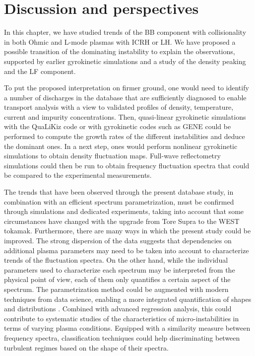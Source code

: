 \section{Discussion and perspectives} \label{discussion_perspective}

In this chapter, we have studied trends of the BB component with collisionality in both Ohmic and L-mode plasmas with ICRH or LH. We have proposed a possible transition of the dominating instability to explain the observations, supported by earlier gyrokinetic simulations and a study of the density peaking and the LF component.

To put the proposed interpretation on firmer ground, one would need to identify a number of discharges in the database that are sufficiently diagnosed to enable transport analysis with a view to validated profiles of density, temperature, current and impurity concentrations. Then, quasi-linear gyrokinetic simulations with the QuaLiKiz code \cite{Bourdelle_2007_PoP_Qualikiz} or with gyrokinetic codes such as GENE could be performed to compute the growth rates of the different instabilities and deduce the dominant ones. In a next step, ones would perform nonlinear gyrokinetic simulations to obtain density fluctuation maps. Full-wave reflectometry simulations could then be run to obtain frequency fluctuation spectra that could be compared to the experimental measurements.

The trends that have been observed through the present database study, in combination with an efficient spectrum parametrization, must be confirmed through simulations and dedicated experiments, taking into account that some circumstances have changed with the upgrade from Tore Supra to the WEST tokamak. Furthermore, there are many ways in which the present study could be improved. The strong dispersion of the data suggests that dependencies on additional plasma parameters may need to be taken into account to characterize trends of the fluctuation spectra. On the other hand, while the individual parameters used to characterize each spectrum may be interpreted from the physical point of view, each of them only quantifies a certain aspect of the spectrum.  The parametrization method could be augmented with modern techniques from data science, enabling a more integrated quantification of shapes and distributions \cite{Shabbir_2016_RSI}. Combined with advanced regression analysis, this could contribute to systematic studies of the characteristics of micro-instabilities in terms of varying plasma conditions. Equipped with a similarity measure between frequency spectra, classification techniques could help discriminating between turbulent regimes based on the shape of their spectra.
